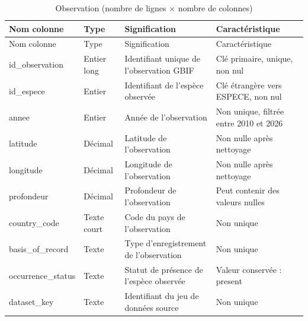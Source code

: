\documentclass[mstat,12pt]{unswthesis}
\begin{document}
\begin{longtable}[]{@{}
  >{\centering\arraybackslash}p{}
  >{\centering\arraybackslash}p{}
  >{\centering\arraybackslash}p{}
  >{\centering\arraybackslash}p{}@{}}
\caption{Observation (nombre de lignes \(\times\) nombre de
colonnes)}\tabularnewline
\toprule\noalign{}
\begin{minipage}[b]{\linewidth}\centering
Nom colonne
\end{minipage} & \begin{minipage}[b]{\linewidth}\centering
Type
\end{minipage} & \begin{minipage}[b]{\linewidth}\centering
Signification
\end{minipage} & \begin{minipage}[b]{\linewidth}\centering
Caractéristique
\end{minipage} \\
\midrule\noalign{}
\endfirsthead
\toprule\noalign{}
\begin{minipage}[b]{\linewidth}\centering
Nom colonne
\end{minipage} & \begin{minipage}[b]{\linewidth}\centering
Type
\end{minipage} & \begin{minipage}[b]{\linewidth}\centering
Signification
\end{minipage} & \begin{minipage}[b]{\linewidth}\centering
Caractéristique
\end{minipage} \\
\midrule\noalign{}
\endhead
\bottomrule\noalign{}
\endlastfoot
id\_observation & Entier long & Identifiant unique de l'observation GBIF
& Clé primaire, unique, non nul \\
id\_espece & Entier & Identifiant de l'espèce observée & Clé étrangère
vers ESPECE, non nul \\
annee & Entier & Année de l'observation & Non unique, filtrée entre 2010
et 2026 \\
latitude & Décimal & Latitude de l'observation & Non nulle après
nettoyage \\
longitude & Décimal & Longitude de l'observation & Non nulle après
nettoyage \\
profondeur & Décimal & Profondeur de l'observation & Peut contenir des
valeurs nulles \\
country\_code & Texte court & Code du pays de l'observation & Non
unique \\
basis\_of\_record & Texte & Type d'enregistrement de l'observation & Non
unique \\
occurrence\_status & Texte & Statut de présence de l'espèce observée &
Valeur conservée : present \\
dataset\_key & Texte & Identifiant du jeu de données source & Non
unique \\
\end{longtable}
\end{document}
